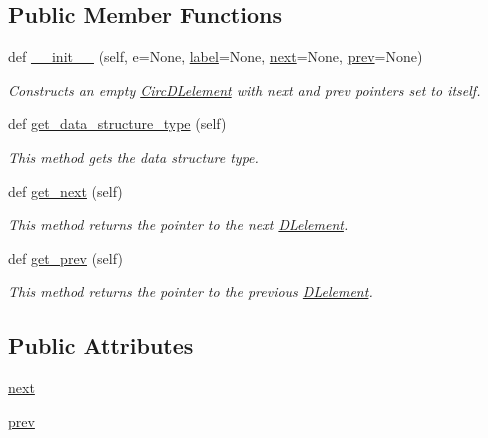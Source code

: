 \subsection*{Public Member Functions}
\begin{DoxyCompactItemize}
\item 
def \mbox{\hyperlink{class_bridges_1_1_circ_d_lelement_1_1_circ_d_lelement_aaea74e300393b3589bf2f566f8916580}{\+\_\+\+\_\+init\+\_\+\+\_\+}} (self, e=None, \mbox{\hyperlink{class_bridges_1_1_element_1_1_element_a301fe5be8cf72b2c62f6a218feeb9166}{label}}=None, \mbox{\hyperlink{class_bridges_1_1_circ_d_lelement_1_1_circ_d_lelement_af101cccf9d2c5c2027b7d812034bc262}{next}}=None, \mbox{\hyperlink{class_bridges_1_1_circ_d_lelement_1_1_circ_d_lelement_a4aee631669271013ced8cd8d677ca812}{prev}}=None)
\begin{DoxyCompactList}\small\item\em Constructs an empty \mbox{\hyperlink{class_bridges_1_1_circ_d_lelement_1_1_circ_d_lelement}{Circ\+D\+Lelement}} with next and prev pointers set to itself. \end{DoxyCompactList}\item 
def \mbox{\hyperlink{class_bridges_1_1_circ_d_lelement_1_1_circ_d_lelement_a00595fd201fbbe870c524efd02c53b83}{get\+\_\+data\+\_\+structure\+\_\+type}} (self)
\begin{DoxyCompactList}\small\item\em This method gets the data structure type. \end{DoxyCompactList}\item 
def \mbox{\hyperlink{class_bridges_1_1_circ_d_lelement_1_1_circ_d_lelement_aa5ee07b40eed6b8528d4dcae0bbd7dd1}{get\+\_\+next}} (self)
\begin{DoxyCompactList}\small\item\em This method returns the pointer to the next \mbox{\hyperlink{namespace_bridges_1_1_d_lelement}{D\+Lelement}}. \end{DoxyCompactList}\item 
def \mbox{\hyperlink{class_bridges_1_1_circ_d_lelement_1_1_circ_d_lelement_ada3069ef0cf2cf2960b5b87036ba66dd}{get\+\_\+prev}} (self)
\begin{DoxyCompactList}\small\item\em This method returns the pointer to the previous \mbox{\hyperlink{namespace_bridges_1_1_d_lelement}{D\+Lelement}}. \end{DoxyCompactList}\end{DoxyCompactItemize}
\subsection*{Public Attributes}
\begin{DoxyCompactItemize}
\item 
\mbox{\hyperlink{class_bridges_1_1_circ_d_lelement_1_1_circ_d_lelement_af101cccf9d2c5c2027b7d812034bc262}{next}}
\item 
\mbox{\hyperlink{class_bridges_1_1_circ_d_lelement_1_1_circ_d_lelement_a4aee631669271013ced8cd8d677ca812}{prev}}
\end{DoxyCompactItemize}
